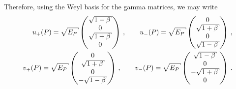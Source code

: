\begin{subappendices}
\begin{example}
    Therefore, using the Weyl basis for the gamma matrices, we may write
    \begin{align}
        \label{eq:bispinor-u-virtual}
        u_+(P)
        =
        \sqrt{E_P}
        \pmtrx{\sqrt{1-\beta}\\0\\\sqrt{1+\beta}\\0}
        \,,\qquad
        u_-(P)
        =
        \sqrt{E_P}
        \pmtrx{0\\\sqrt{1+\beta}\\0\\\sqrt{1-\beta}}
        \,,
        \\
        \label{eq:bispinor-v-virtual}
        v_+(P)
        =
        \sqrt{E_P}
        \pmtrx{0\\\sqrt{1+\beta}\\0\\-\sqrt{1-\beta}}
        \,,\qquad
        v_-(P)
        =
        \sqrt{E_P}
        \pmtrx{\sqrt{1-\beta}\\0\\-\sqrt{1+\beta}\\0}
        \,.
    \end{align}

\end{example}




\end{subappendices}
